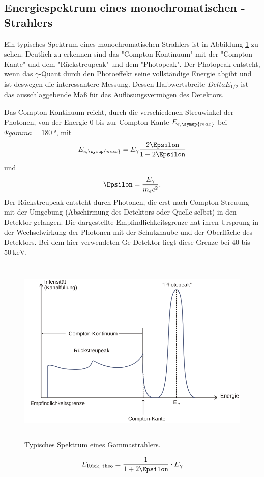 \subsection{Energiespektrum eines monochromatischen \texorpdfstring{\gamma-}{gamma}Strahlers}
Ein typisches Spektrum eines monochromatischen Strahlers ist in Abbildung \ref{fig:Spektrum} zu sehen.
Deutlich zu erkennen sind das "Compton-Kontinuum" mit der "Compton-Kante" und dem "Rückstreupeak" und dem "Photopeak".
Der Photopeak entsteht, wenn das $\gamma$-Quant durch den Photoeffekt seine vollständige Energie abgibt und ist deswegen die interessantere Messung.
Dessen Halbwertsbreite $Delta E_{1/2}$ ist das ausschlaggebende Maß für das Auflösungsvermögen des Detektors.

Das Compton-Kontinuum reicht, durch die verschiedenen Streuwinkel der Photonen, von der Energie 0 bis zur Compton-Kante $E_{e,\symup{max}}$ bei $\Psi{gamma}=\SI{180}{\degree}$, mit
\begin{equation}
\label{eqn:Com_Kante}
E_{e,\symup{max}}=E_{\gamma}\frac{2\Epsilon}{1+2\Epsilon}
\end{equation}
und
\begin{equation*}
\Epsilon = \frac{E_{\gamma}}{m_e c^2}.
\end{equation*}
Der Rückstreupeak entsteht durch Photonen, die erst nach Compton-Streuung mit der Umgebung (Abschirmung des Detektors oder Quelle selbst) in den Detektor gelangen.
Die dargestellte Empfindlichkeitsgrenze hat ihren Ursprung in der Wechselwirkung der Photonen mit der Schutzhaube und der Oberfläche des Detektors.
Bei dem hier verwendeten Ge-Detektor liegt diese Grenze bei $40$ bis $\SI{50}{\kilo\electronvolt}$.
 \begin{figure}
   \centering
   \includegraphics[height=9cm]{content/Spektrum.png}
   \caption{Typisches Spektrum eines Gammastrahlers.\cite{V18}}
   \label{fig:Spektrum}
 \end{figure}

\begin{equation}
  \label{eqn:rueck}
  E_\text{Rück, theo} = \frac{1}{1+2\Epsilon} \cdot E_{\gamma}
\end{equation}
